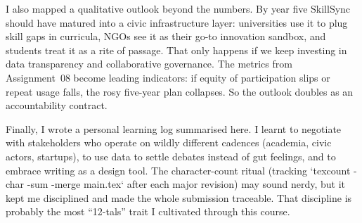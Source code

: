 I also mapped a qualitative outlook beyond the numbers. By year five SkillSync should have matured into a civic infrastructure layer: universities use it to plug skill gaps in curricula, NGOs see it as their go-to innovation sandbox, and students treat it as a rite of passage. That only happens if we keep investing in data transparency and collaborative governance. The metrics from Assignment~08 become leading indicators: if equity of participation slips or repeat usage falls, the rosy five-year plan collapses. So the outlook doubles as an accountability contract.

Finally, I wrote a personal learning log summarised here. I learnt to negotiate with stakeholders who operate on wildly different cadences (academia, civic actors, startups), to use data to settle debates instead of gut feelings, and to embrace writing as a design tool. The character-count ritual (tracking `texcount -char -sum -merge main.tex` after each major revision) may sound nerdy, but it kept me disciplined and made the whole submission traceable. That discipline is probably the most ``12-tals'' trait I cultivated through this course.
